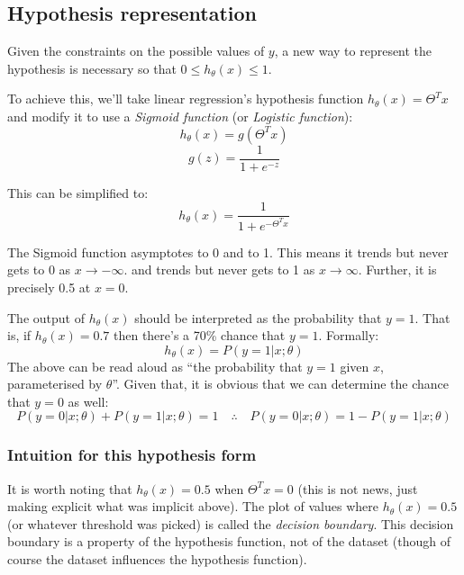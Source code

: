 \subsection{Hypothesis representation}

Given the constraints on the possible values of $y$, a new way to represent the hypothesis is necessary so that $0 \leq h_\theta(x) \leq 1$.

To achieve this, we'll take linear regression's hypothesis function $h_\theta(x) = \Theta^Tx$ and modify it to use a \emph{Sigmoid function} (or \emph{Logistic function}):
\begin{equation}
\label{Logistic Regression Hypothesis form}
h_\theta(x) = g(\Theta^Tx)
\end{equation}
\begin{equation}
\label{Sigmoid function}
g(z) = \frac{1}{1 + e^{-z}}
\end{equation}

This can be simplified to:
\begin{equation}
\label{Compact logistic regression hypothesis}
h_\theta(x) = \frac{1}{1 + e^{-\Theta^Tx}}
\end{equation}

The Sigmoid function asymptotes to 0 and to 1. This means it trends but never gets to 0 as $x \rightarrow - \infty$. and trends but never gets to 1 as $x \rightarrow \infty$. Further, it is precisely 0.5 at $x = 0$.

The output of $h_\theta(x)$ should be interpreted as the probability that $y = 1$. That is, if $h_\theta(x) = 0.7$ then there's a 70\% chance that $y = 1$. Formally:
\[
h_\theta(x) = P(y=1 | x;\theta)
\]
The above can be read aloud as ``the probability that $y = 1$ given $x$, parameterised by $\theta$''. Given that, it is obvious that we can determine the chance that $y = 0$ as well:
\[
P(y=0 | x;\theta) + P(y=1 | x;\theta) = 1
\quad\therefore\quad
P(y=0 | x;\theta) = 1 - P(y=1 | x;\theta)
\]

\subsubsection{Intuition for this hypothesis form}
It is worth noting that $h_\theta(x) = 0.5$ when $\Theta^Tx = 0$ (this is not news, just making explicit what was implicit above). 
The plot of values where $h_\theta(x) = 0.5$ (or whatever threshold was picked) is called the \emph{decision boundary}. This decision boundary is a property of the hypothesis function, not of the dataset (though of course the dataset influences the hypothesis function).

